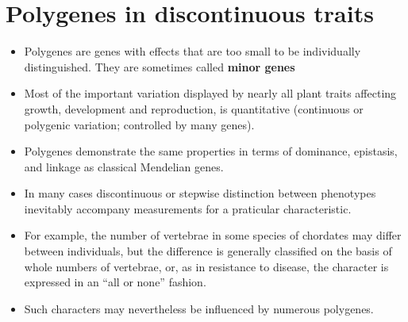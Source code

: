 \documentclass[11pt,dvipsnames,ignorenonframetext,aspectratio=169]{beamer}
\providecommand{\tightlist}{%
  \setlength{\itemsep}{0pt}\setlength{\parskip}{0pt}}
\begin{document}
\hypertarget{polygenes-in-discontinuous-traits}{%
\section{Polygenes in discontinuous
traits}\label{polygenes-in-discontinuous-traits}}

\begin{frame}{}
\protect\hypertarget{section-4}{}

\begin{itemize}
\tightlist
\item
  Polygenes are genes with effects that are too small to be individually
  distinguished. They are sometimes called \textbf{minor genes}
\item
  Most of the important variation displayed by nearly all plant traits
  affecting growth, development and reproduction, is quantitative
  (continuous or polygenic variation; controlled by many genes).
\item
  Polygenes demonstrate the same properties in terms of dominance,
  epistasis, and linkage as classical Mendelian genes.
\end{itemize}

\end{frame}

\begin{frame}{}
\protect\hypertarget{section-5}{}

\begin{itemize}
\tightlist
\item
  In many cases discontinuous or stepwise distinction between phenotypes
  inevitably accompany measurements for a praticular characteristic.
\item
  For example, the number of vertebrae in some species of chordates may
  differ between individuals, but the difference is generally classified
  on the basis of whole numbers of vertebrae, or, as in resistance to
  disease, the character is expressed in an ``all or none'' fashion.
\item
  Such characters may nevertheless be influenced by numerous polygenes.
\end{itemize}

\end{frame}
\end{document}
